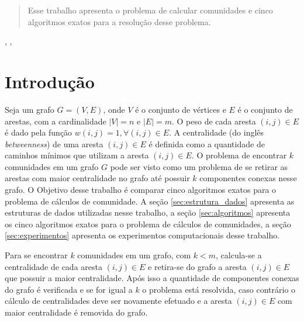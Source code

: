 \documentclass{proc}
\begin{document}

\author{João C. Abreu}



\begin{abstract}
Esse trabalho apresenta o problema de calcular comunidades e cinco algoritmos exatos para a resolução desse problema.

\end{abstract}

\begin{keywords}
, , 
\end{keywords}

\doublespacing

\section{Introdução}
\label{sec:intro}

Seja um grafo $G = (V,E)$, onde $V$ é o conjunto de vértices e $E$ é o conjunto de arestas, com a cardinalidade $|V| = n$ e 
$|E| = m$. O peso de cada aresta $(i, j) \in E$ é dado pela função $w(i, j) = 1, \forall (i, j) \in E$. A
centralidade (do inglês \emph{betweenness}) de uma aresta $(i, j) \in E$ é definida como a quantidade de caminhos mínimos que utilizam
a aresta $(i, j) \in E$. O problema de encontrar $k$ comunidades em um grafo $G$ pode ser visto como um problema de se 
retirar as arestas com maior centralidade no grafo até possuir $k$ componentes conexas nesse grafo.
O Objetivo desse trabalho é comparar cinco algoritmos exatos para o problema de cálculos de comunidade. 
A seção \ref{sec:estrutura_dados} apresenta as estruturas de dados utilizadas nesse trabalho, a seção \ref{sec:algoritmos}
apresenta os cinco algoritmos exatos para o problema de cálculos de comunidades, a seção \ref{sec:experimentos}
apresenta os experimentos computacionais desse trabalho.


Para se encontrar $k$ comunidades em um grafo, com $k < m$, calcula-se a centralidade de cada 
aresta $(i, j) \in E$ e retira-se do grafo a aresta $(i, j) \in E$ que possuir a maior centralidade. Após isso a quantidade de componentes conexas do grafo é verificada e se for igual a $k$ o problema está resolvida, caso contrário o cálculo de centralidades
deve ser novamente efetuado e a aresta $(i, j) \in E$ com maior centralidade é removida do grafo.
\end{document}
